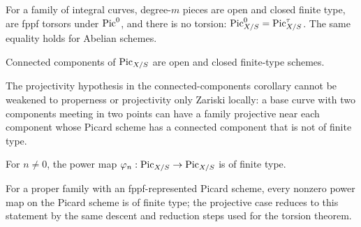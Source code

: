 \begin{remark}\label{kps-rmk-curves}
For a family of integral curves, degree-$m$ pieces are open and closed finite
type, are fppf torsors under $\operatorname{Pic}^0$, and there is no torsion:
$\operatorname{Pic}^0_{X/S}=\operatorname{Pic}^\tau_{X/S}$. The same equality holds for Abelian schemes.
\end{remark}
\begin{corollary}\label{kps-cor-connected-components}
Connected components of $\operatorname{Pic}_{X/S}$ are open and closed finite-type schemes.
\end{corollary}
\begin{remark}\label{kps-rmk-connected-projectivity}
The projectivity hypothesis in the connected-components corollary cannot be
weakened to properness or projectivity only Zariski locally: a base curve with
two components meeting in two points can have a family projective near each
component whose Picard scheme has a connected component that is not of finite
type.
\end{remark}
\begin{corollary}\label{kps-cor-power-map}
For $n\ne0$, the power map $\varphi_n:\operatorname{Pic}_{X/S}\to\operatorname{Pic}_{X/S}$ is of finite
type.
\end{corollary}
\begin{remark}\label{kps-rmk-power-map-general}
For a proper family with an fppf-represented Picard scheme, every nonzero power
map on the Picard scheme is of finite type; the projective case reduces to this
statement by the same descent and reduction steps used for the torsion theorem.
\end{remark}
